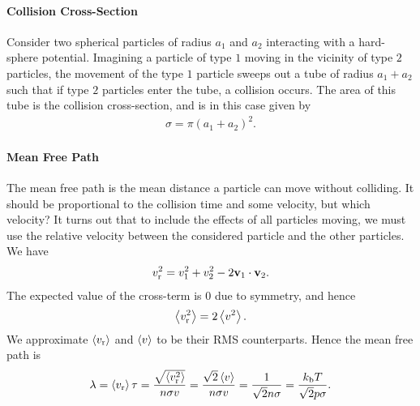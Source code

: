 \paragraph{Collision Cross-Section}
Consider two spherical particles of radius $a_{1}$ and $a_{2}$ interacting with a hard-sphere potential. Imagining a particle of type $1$ moving in the vicinity of type $2$ particles, the movement of the type $1$ particle sweeps out a tube of radius $a_{1} + a_{2}$ such that if type $2$ particles enter the tube, a collision occurs. The area of this tube is the collision cross-section, and is in this case given by
\begin{align*}
	\sigma = \pi(a_{1} + a_{2})^{2}.
\end{align*}

\paragraph{Mean Free Path}
The mean free path is the mean distance a particle can move without colliding. It should be proportional to the collision time and some velocity, but which velocity? It turns out that to include the effects of all particles moving, we must use the relative velocity between the considered particle and the other particles. We have
\begin{align*}
	v_{\text{r}}^{2} = v_{1}^{2} + v_{2}^{2} - 2\vb{v}_{1}\cdot\vb{v}_{2}.
\end{align*}
The expected value of the cross-term is $0$ due to symmetry, and hence
\begin{align*}
	\expval{v_{\text{r}}^{2}} = 2\expval{v^{2}}.
\end{align*}
We approximate $\expval{v_{\text{r}}}$ and $\expval{v}$ to be their RMS counterparts. Hence the mean free path is
\begin{align*}
	\lambda = \expval{v_{\text{r}}}\tau = \frac{\sqrt{\expval{v_{\text{r}}^{2}}}}{n\sigma v} = \frac{\sqrt{2}\expval{v}}{n\sigma v} = \frac{1}{\sqrt{2}n\sigma} = \frac{k_{\text{b}} T}{\sqrt{2}p\sigma}.
\end{align*}